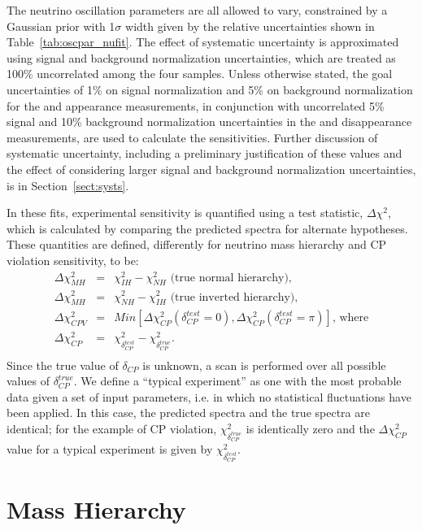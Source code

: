The neutrino oscillation parameters are all
allowed to vary, constrained by a Gaussian prior with 1$\sigma$ width given
by the relative uncertainties shown in Table~\ref{tab:oscpar_nufit}.
The effect of systematic uncertainty
is approximated using signal and background normalization uncertainties, which
are treated as 100\% uncorrelated among the four samples.
Unless otherwise stated, the goal uncertainties of 1\% on signal normalization 
and 5\% on background normalization for the \nue and \anue
appearance measurements, in conjunction with uncorrelated
5\% signal and 10\% background normalization uncertainties in the \numu and
\anumu disappearance measurements, are used to calculate the sensitivities.
Further discussion of systematic uncertainty, including a preliminary justification of
these values and the effect
of considering larger signal and background normalization uncertainties, is
in Section~\ref{sect:systs}. 



In these fits, experimental sensitivity is
quantified using a test statistic, $\Delta\chi^2$, which is calculated
by comparing the predicted spectra for alternate hypotheses.
These quantities are defined, differently for neutrino mass hierarchy
and CP violation sensitivity, to be:
\begin{eqnarray}
\Delta\chi^2_{MH} & = & \chi^2_{IH} - \chi^2_{NH}\textrm{ (true normal hierarchy),}\\ 
\Delta\chi^2_{MH} & = & \chi^2_{NH} - \chi^2_{IH}\textrm{ (true inverted hierarchy),}\\
\Delta\chi^2_{CPV} & = & Min[\Delta\chi^2_{CP}(\delta_{CP}^{test}=0),\Delta\chi^2_{CP}(\delta_{CP}^{test}=\pi)]\textrm{, where} \\
\Delta\chi^2_{CP} & = & \chi^2_{\delta_{CP}^{test}} - \chi^2_{\delta_{CP}^{true}}. \\ \nonumber
\end{eqnarray}
Since the true value of $\delta_{CP}$ is unknown, a scan is  performed over
all possible values of $\delta_{CP}^{true}$. 
We define a ``typical experiment'' as one with the most probable data given a set of input parameters, 
i.e. in which no statistical fluctuations have been applied.
In this case, the predicted spectra and the true spectra are identical;
for the example of CP violation, $\chi^2_{\delta_{CP}^{true}}$ 
is identically zero and the $\Delta\chi^2_{CP}$ value for a typical experiment is given by 
$\chi^2_{\delta_{CP}^{test}}$.

\section{Mass Hierarchy}
\label{sec:physics-lbnosc-mh}


